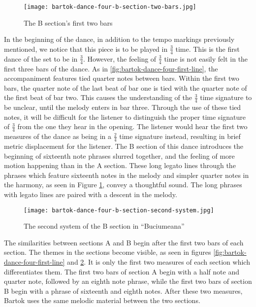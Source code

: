 \begin{figure}
  \centering
  \texttt{[image: bartok-dance-four-b-section-two-bars.jpg]}
  \caption[The first two bars of the B section in ``Buciumeana'' of Bartok's \textit{Romanian Folk Dances}, Sz. 56, BB 68]{The B section's first two bars}
  \label{fig:bartok-dance-four-b-section-two-bars}
\end{figure}

In the beginning of the dance, in addition to the tempo markings previously mentioned, we notice that this piece is to be played in $\frac{3}{4}$ time. This is the first dance of the set to be in $\frac{3}{4}$. However, the feeling of $\frac{3}{4}$ time is not easily felt in the first three bars of the dance. As in \ref{fig:bartok-dance-four-first-line}\autocite{Lung_2016}, the accompaniment features tied quarter notes between bars. Within the first two bars, the quarter note of the last beat of bar one is tied with the quarter note of the first beat of bar two. This causes the understanding of the $\frac{3}{4}$ time signature to be unclear, until the melody enters in bar three. Through the use of these tied notes, it will be difficult for the listener to distinguish the proper time signature of $\frac{3}{4}$ from the one they hear in the opening. The listener would hear the first two measures of the dance as being in a $\frac{2}{4}$ time signature instead, resulting in brief metric displacement for the listener. The B section of this dance introduces the beginning of sixteenth note phrases slurred together, and the feeling of more motion happening than in the A section. These long legato lines through the phrases which feature sixteenth notes in the melody and simpler quarter notes in the harmony, as seen in Figure \ref{fig:bartok-dance-four-b-section-two-bars}\autocite{Lung_2016}, convey a thoughtful sound. The long phrases with legato lines are paired with a descent in the melody. 

\begin{figure}
  \centering
  \texttt{[image: bartok-dance-four-b-section-second-system.jpg]}
  \caption[The second system of ``Buciumeana'' in Bartok's \textit{Romanian Folk Dances, Sz. 56, BB 88}]{The second system of the B section in ``Buciumeana''}
  \label{fig:bartok-dance-four-b-section-second-system}
\end{figure}

The similarities between sections A and B begin after the first two bars of each section. The themes in the sections become visible, as seen in figures \ref{fig:bartok-dance-four-first-line}\autocite{Lung_2016} and \ref{fig:bartok-dance-four-b-section-second-system}\autocite{Lung_2016}. It is only the first two measures of each section which differentiates them. The first two bars of section A begin with a half note and quarter note, followed by an eighth note phrase, while the first two bars of section B begin with a phrase of sixteenth and eighth notes. After these two measures, Bartok uses the same melodic material between the two sections. 

